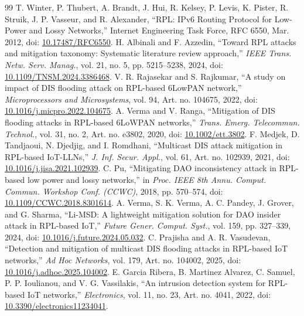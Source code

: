 \begin{thebibliography}{99}
 T. Winter, P. Thubert, A. Brandt, J. Hui, R. Kelsey, P. Levis, K. Pister, R. Struik, J. P. Vasseur, and R. Alexander, ``RPL: IPv6 Routing Protocol for Low-Power and Lossy Networks,'' Internet Engineering Task Force, RFC 6550, Mar. 2012, doi: \href{https://doi.org/10.17487/RFC6550}{10.17487/RFC6550}.
 H. Albinali and F. Azzedin, ``Toward RPL attacks and mitigation taxonomy: Systematic literature review approach,'' \emph{IEEE Trans. Netw. Serv. Manag.}, vol. 21, no. 5, pp. 5215--5238, 2024, doi: \href{https://doi.org/10.1109/TNSM.2024.3386468}{10.1109/TNSM.2024.3386468}.
 V. R. Rajasekar and S. Rajkumar, ``A study on impact of DIS flooding attack on RPL-based 6LowPAN network,'' \emph{Microprocessors and Microsystems}, vol. 94, Art. no. 104675, 2022, doi: \href{https://doi.org/10.1016/j.micpro.2022.104675}{10.1016/j.micpro.2022.104675}.
 A. Verma and V. Ranga, ``Mitigation of DIS flooding attacks in RPL-based 6LoWPAN networks,'' \emph{Trans. Emerg. Telecommun. Technol.}, vol. 31, no. 2, Art. no. e3802, 2020, doi: \href{https://doi.org/10.1002/ett.3802}{10.1002/ett.3802}.
 F. Medjek, D. Tandjaoui, N. Djedjig, and I. Romdhani, ``Multicast DIS attack mitigation in RPL-based IoT-LLNs,'' \emph{J. Inf. Secur. Appl.}, vol. 61, Art. no. 102939, 2021, doi: \href{https://doi.org/10.1016/j.jisa.2021.102939}{10.1016/j.jisa.2021.102939}.
 C. Pu, ``Mitigating DAO inconsistency attack in RPL-based low power and lossy networks,'' in \emph{Proc. IEEE 8th Annu. Comput. Commun. Workshop Conf. (CCWC)}, 2018, pp. 570--574, doi: \href{https://doi.org/10.1109/CCWC.2018.8301614}{10.1109/CCWC.2018.8301614}.
 A. Verma, S. K. Verma, A. C. Pandey, J. Grover, and G. Sharma, ``Li-MSD: A lightweight mitigation solution for DAO insider attack in RPL-based IoT,'' \emph{Future Gener. Comput. Syst.}, vol. 159, pp. 327--339, 2024, doi: \href{https://doi.org/10.1016/j.future.2024.05.032}{10.1016/j.future.2024.05.032}.
 C. Prajisha and A. R. Vasudevan, ``Detection and mitigation of multicast DIS flooding attacks in RPL-based IoT networks,'' \emph{Ad Hoc Networks}, vol. 179, Art. no. 104002, 2025, doi: \href{https://doi.org/10.1016/j.adhoc.2025.104002}{10.1016/j.adhoc.2025.104002}.
 E. Garcia Ribera, B. Martinez Alvarez, C. Samuel, P. P. Ioulianou, and V. G. Vassilakis, ``An intrusion detection system for RPL-based IoT networks,'' \emph{Electronics}, vol. 11, no. 23, Art. no. 4041, 2022, doi: \href{https://doi.org/10.3390/electronics11234041}{10.3390/electronics11234041}.

\end{thebibliography}
